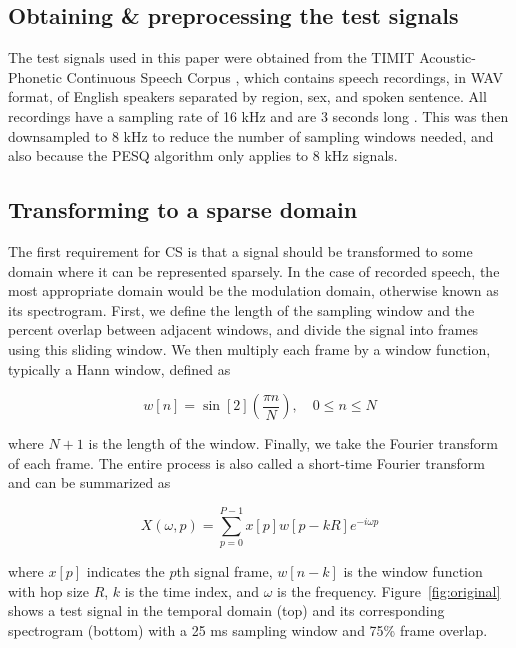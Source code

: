 \documentclass[10pt,a4paper,twoside]{article}
\begin{document}
\subsection{Obtaining \& preprocessing the test signals}\label{ssec:timit}
The test signals used in this paper were obtained from the TIMIT Acoustic-Phonetic Continuous Speech Corpus \cite{timit}, which contains speech recordings, in WAV format, of English speakers separated by region, sex, and spoken sentence. All recordings have a sampling rate of 16 kHz and are 3 seconds long . This was then downsampled to 8 kHz to reduce the number of sampling windows needed, and also because the PESQ algorithm only applies to 8 kHz signals.

\subsection{Transforming to a sparse domain}\label{ssec:sparse}
The first requirement for CS is that a signal should be transformed to some domain where it can be represented sparsely. In the case of recorded speech, the most appropriate domain would be the modulation domain, otherwise known as its spectrogram. First, we define the length of the sampling window and the percent overlap between adjacent windows, and divide the signal into frames using this sliding window. We then multiply each frame by a window function, typically a Hann window, defined as

\begin{equation}\label{eq:hann}
	w[n] = \sin[2](\frac{\pi n}{N}), \quad 0 \leq n \leq N
\end{equation}

\noindent where $N+1$ is the length of the window. Finally, we take the Fourier transform of each frame. The entire process is also called a short-time Fourier transform and can be summarized as

\begin{equation}\label{eq:stft}
	X(\omega, p) = \sum_{p=0}^{P-1} x[p] w[p - kR] e^{-i\omega p}
\end{equation}

\noindent where $x[p]$ indicates the $p$th signal frame, $w[n-k]$ is the window function with hop size $R$, $k$ is the time index, and $\omega$ is the frequency. Figure~\ref{fig:original} shows a test signal in the temporal domain (top) and its corresponding spectrogram (bottom) with a 25 ms sampling window and 75\% frame overlap.
\end{document}
